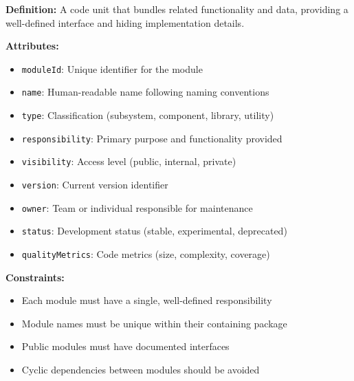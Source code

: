 \documentclass[11pt,letterpaper]{article}
\begin{document}
\begin{definitionbox}
\textbf{Definition:} A code unit that bundles related functionality and data, providing a well-defined interface and hiding implementation details.

\textbf{Attributes:}
\begin{itemize}[nosep]
    \item \texttt{moduleId}: Unique identifier for the module
    \item \texttt{name}: Human-readable name following naming conventions
    \item \texttt{type}: Classification (subsystem, component, library, utility)
    \item \texttt{responsibility}: Primary purpose and functionality provided
    \item \texttt{visibility}: Access level (public, internal, private)
    \item \texttt{version}: Current version identifier
    \item \texttt{owner}: Team or individual responsible for maintenance
    \item \texttt{status}: Development status (stable, experimental, deprecated)
    \item \texttt{qualityMetrics}: Code metrics (size, complexity, coverage)
\end{itemize}

\textbf{Constraints:}
\begin{itemize}[nosep]
    \item Each module must have a single, well-defined responsibility
    \item Module names must be unique within their containing package
    \item Public modules must have documented interfaces
    \item Cyclic dependencies between modules should be avoided
\end{itemize}
\end{definitionbox}
\end{document}
